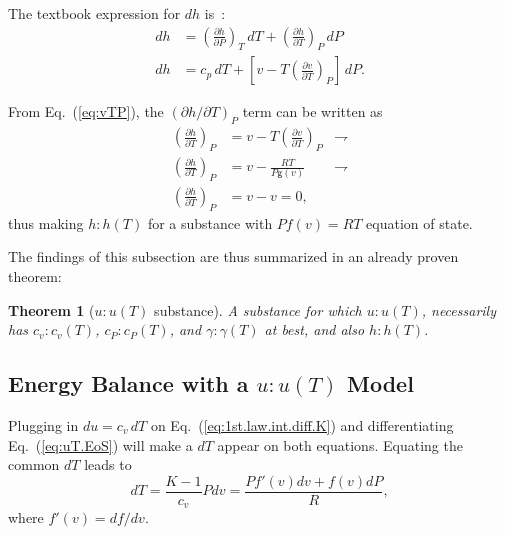 \documentclass[fleqn,11pt]{SelfArx}
\newcommand{\parxyz}[3]{\left(\frac{\partial {{#1}}}{\partial {{#2}}}\right)_{\!\!\!{#3}}}
\newcommand{\inlxyz}[3]{({\partial {{#1}}}/{\partial {{#2}}})_{{#3}}}
\newtheorem{theorem}{Theorem}
\begin{document}
    The textbook expression for $dh$ is~\cite{2013-CengelYA+BolesMA-AMGH}:
    \begin{align}
        dh & = \parxyz hPT \,dT + \parxyz hTP \,dP \\
        dh & = c_p\,dT + \left[v - T\parxyz vTP \right]\,dP.
        \label{eq:dh}
    \end{align}

    From Eq.~(\ref{eq:vTP}), the $\inlxyz hTP$ term can be written as
    \begin{align}
        \parxyz hTP & = v - T\parxyz vTP & \rightharpoondown \\
        \parxyz hTP & = v - \frac{RT}{P\mathsf{g}(v)} & \rightharpoondown \\
        \parxyz hTP & = v - v = 0,
        \label{eq:hTP}
    \end{align}
    \noindent thus making $h\!:\!h(T)$ for a substance with $Pf(v) = RT$ equation of state.

    The findings of this subsection are thus summarized in an already proven theorem:

    \begin{theorem}[$u\!:\!u(T)$ substance]\label{theo:uT.subst}
        A substance for which $u\!:\!u(T)$, necessarily has $c_v\!:\!c_v(T)$, $c_P\!:\!c_P(T)$,
        and $\gamma\!:\!\gamma(T)$ at best, and also $h\!:\!h(T)$.
    \end{theorem}

    \subsection{Energy Balance with a $u\!:\!u(T)$ Model}

    Plugging  in  $du  =  c_v\,dT$  on  Eq.~(\ref{eq:1st.law.int.diff.K})  and   differentiating
    Eq.~(\ref{eq:uT.EoS}) will make a $dT$ appear on both equations. Equating  the  common  $dT$
    leads to
    \begin{equation}
        dT = \frac{K-1}{c_v}Pdv = \frac{Pf'(v)dv + f(v)dP}{R},
        \label{eq:dT.1st.law.EoS}
    \end{equation}
    \noindent where $f'(v) = df/dv$.
\end{document}
